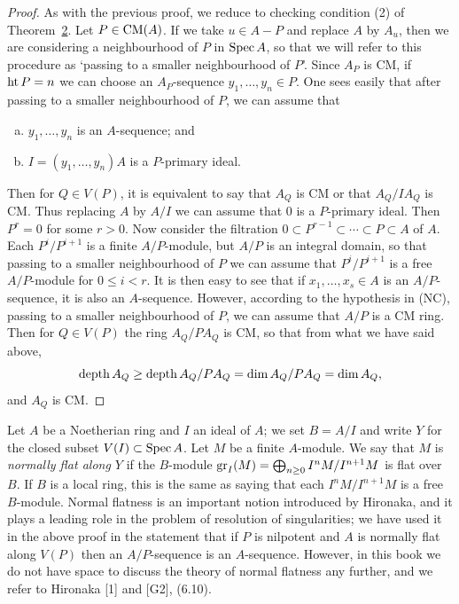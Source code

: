 \begin{proof}
As with the previous proof, we reduce to checking condition (2) of
Theorem~\hyperref[thm:24.2]{2}. Let $P \in \operatorname{CM}(A)$. If we take $u \in A - P$ and replace $A$ by $A_u$,
then we are considering a neighbourhood of $P$ in $\operatorname{Spec} A$, so that we will refer
to this procedure as `passing to a smaller neighbourhood of $P$'. Since $A_P$ is
CM, if $\operatorname{ht} P = n$ we can choose an $A_P$-sequence $y_1, \ldots, y_n \in P$. One sees
easily that after passing to a smaller neighbourhood of $P$, we can assume that
\begin{enumerate}[(a)]
  \item $y_1, \ldots, y_n$ is an $A$-sequence; and
  \item $I = (y_1, \ldots, y_n)A$ is a $P$-primary ideal.
\end{enumerate}
Then for $Q \in V(P)$, it is equivalent to say that $A_Q$ is CM or that $A_Q/IA_Q$
is CM. Thus replacing $A$ by $A/I$ we can assume that $0$ is a $P$-primary ideal.
Then $P^r = 0$ for some $r > 0$. Now consider the filtration
$0 \subset P^{r-1} \subset \cdots \subset P \subset A$ of $A$. Each $P^i/P^{i+1}$ is a finite
$A/P$-module, but $A/P$ is an integral domain, so that passing to a smaller
neighbourhood of $P$ we can assume that $P^i/P^{i+1}$ is a free $A/P$-module for
$0 \le i < r$. It is then easy to see that if $x_1, \ldots, x_s \in A$ is an
$A/P$-sequence, it is also an $A$-sequence. However, according to the hypothesis
in (NC), passing to a smaller neighbourhood of $P$, we can assume that $A/P$ is a
CM ring. Then for $Q \in V(P)$ the ring $A_Q/PA_Q$ is CM, so that from what we have
said above,
\[
  \operatorname{depth} A_Q \ge \operatorname{depth} A_Q/PA_Q = \dim A_Q/PA_Q = \dim A_Q,
\]
and $A_Q$ is CM.
\end{proof}

Let $A$ be a Noetherian ring and $I$ an ideal of $A$; we set $B = A/I$ and write
$Y$ for the closed subset $V(I) \subset \operatorname{Spec} A$. Let $M$ be a finite $A$-module. We
say that $M$ is \emph{normally flat along $Y$} if the $B$-module
$\operatorname{gr}_I(M) = \bigoplus_{n \ge 0} I^nM/I^{n+1}M$ is flat over $B$. If $B$ is a local
ring, this is the same as saying that each $I^nM/I^{n+1}M$ is a free $B$-module.
Normal flatness is an important notion introduced by Hironaka, and it plays a
leading role in the problem of resolution of singularities; we have used it in
the above proof in the statement that if $P$ is nilpotent and $A$ is normally
flat along $V(P)$ then an $A/P$-sequence is an $A$-sequence. However, in this
book we do not have space to discuss the theory of normal flatness any further,
and we refer to Hironaka [1] and [G2], (6.10).

